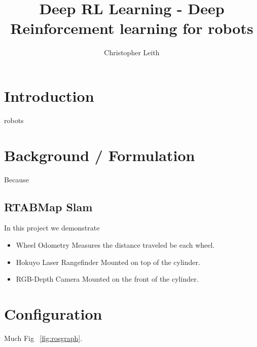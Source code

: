 \documentclass[10pt,journal,compsoc]{IEEEtran}
\begin{document}
\title{Deep RL Learning - Deep Reinforcement learning for robots}

\author{Christopher Leith}

%
{}


\maketitle
\IEEEdisplaynontitleabstractindextext
\IEEEpeerreviewmaketitle
\label{sec:Introduction}
\section{Introduction}
 robots 
\section{Background / Formulation}
Because 

\subsection{RTABMap Slam}
In this project we demonstrate 
\begin{itemize}
 \item Wheel Odometry
 Measures the distance traveled be each wheel.
 \item Hokuyo Laser Rangefinder
 Mounted on top of the cylinder.
 \item RGB-Depth Camera
 Mounted on the front of the cylinder.
\end{itemize}



\section{Configuration}
Much Fig ~\ref{fig:rosgraph}.
\end{document}
